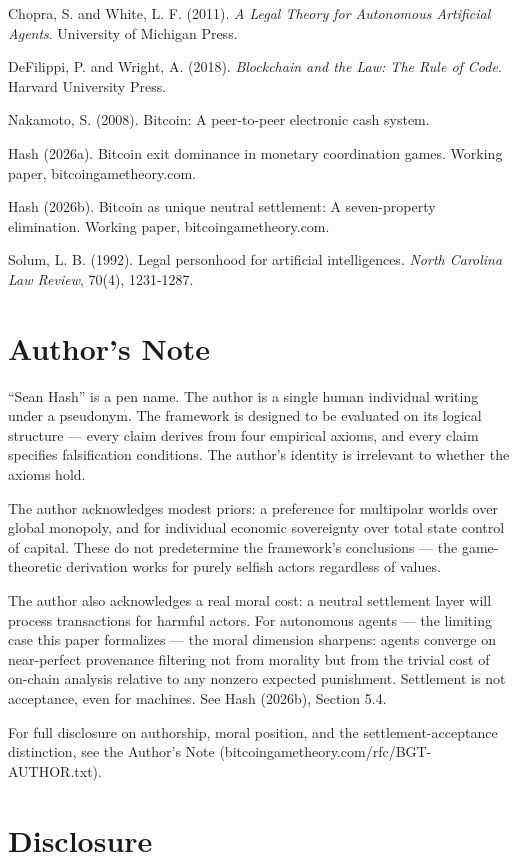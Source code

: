 \documentclass[12pt]{article}
\theoremstyle{definition}
\theoremstyle{remark}
\begin{document}
Chopra, S. and White, L. F. (2011). \emph{A Legal Theory for Autonomous
Artificial Agents}. University of Michigan Press.

DeFilippi, P. and Wright, A. (2018). \emph{Blockchain and the Law: The
Rule of Code}. Harvard University Press.

Nakamoto, S. (2008). Bitcoin: A peer-to-peer electronic cash system.

Hash (2026a). Bitcoin exit dominance in monetary coordination games.
Working paper, bitcoingametheory.com.

Hash (2026b). Bitcoin as unique neutral settlement: A seven-property
elimination. Working paper, bitcoingametheory.com.

Solum, L. B. (1992). Legal personhood for artificial intelligences.
\emph{North Carolina Law Review}, 70(4), 1231-1287.
\section{Author's Note}\label{authors-note}

``Sean Hash'' is a pen name. The author is a single human individual
writing under a pseudonym. The framework is designed to be evaluated on
its logical structure --- every claim derives from four empirical
axioms, and every claim specifies falsification conditions. The author's
identity is irrelevant to whether the axioms hold.

The author acknowledges modest priors: a preference for multipolar
worlds over global monopoly, and for individual economic sovereignty
over total state control of capital. These do not predetermine the
framework's conclusions --- the game-theoretic derivation works for
purely selfish actors regardless of values.

The author also acknowledges a real moral cost: a neutral settlement
layer will process transactions for harmful actors. For autonomous
agents --- the limiting case this paper formalizes --- the moral
dimension sharpens: agents converge on near-perfect provenance filtering
not from morality but from the trivial cost of on-chain analysis
relative to any nonzero expected punishment. Settlement is not
acceptance, even for machines. See Hash (2026b), Section 5.4.

For full disclosure on authorship, moral position, and the
settlement-acceptance distinction, see the Author's Note
(bitcoingametheory.com/rfc/BGT-AUTHOR.txt).

\section{Disclosure}\label{disclosure}
\end{document}
